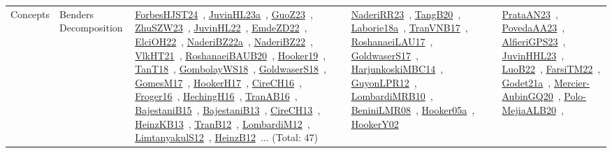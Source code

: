 {\begin{longtable}{lp{3cm}>{\raggedright\arraybackslash}p{6cm}>{\raggedright\arraybackslash}p{6cm}>{\raggedright\arraybackslash}p{8cm}}
Concepts & Benders Decomposition & \href{../works/ForbesHJST24.pdf}{ForbesHJST24}~\cite{ForbesHJST24}, \href{../works/JuvinHL23a.pdf}{JuvinHL23a}~\cite{JuvinHL23a}, \href{../works/GuoZ23.pdf}{GuoZ23}~\cite{GuoZ23}, \href{../works/ZhuSZW23.pdf}{ZhuSZW23}~\cite{ZhuSZW23}, \href{../works/JuvinHL22.pdf}{JuvinHL22}~\cite{JuvinHL22}, \href{../works/EmdeZD22.pdf}{EmdeZD22}~\cite{EmdeZD22}, \href{../works/ElciOH22.pdf}{ElciOH22}~\cite{ElciOH22}, \href{../works/NaderiBZ22a.pdf}{NaderiBZ22a}~\cite{NaderiBZ22a}, \href{../works/NaderiBZ22.pdf}{NaderiBZ22}~\cite{NaderiBZ22}, \href{../works/VlkHT21.pdf}{VlkHT21}~\cite{VlkHT21}, \href{../works/RoshanaeiBAUB20.pdf}{RoshanaeiBAUB20}~\cite{RoshanaeiBAUB20}, \href{../works/Hooker19.pdf}{Hooker19}~\cite{Hooker19}, \href{../works/TanT18.pdf}{TanT18}~\cite{TanT18}, \href{../works/GombolayWS18.pdf}{GombolayWS18}~\cite{GombolayWS18}, \href{../works/GoldwaserS18.pdf}{GoldwaserS18}~\cite{GoldwaserS18}, \href{../works/GomesM17.pdf}{GomesM17}~\cite{GomesM17}, \href{../works/HookerH17.pdf}{HookerH17}~\cite{HookerH17}, \href{../works/CireCH16.pdf}{CireCH16}~\cite{CireCH16}, \href{../works/Froger16.pdf}{Froger16}~\cite{Froger16}, \href{../works/HechingH16.pdf}{HechingH16}~\cite{HechingH16}, \href{../works/TranAB16.pdf}{TranAB16}~\cite{TranAB16}, \href{../works/BajestaniB15.pdf}{BajestaniB15}~\cite{BajestaniB15}, \href{../works/BajestaniB13.pdf}{BajestaniB13}~\cite{BajestaniB13}, \href{../works/CireCH13.pdf}{CireCH13}~\cite{CireCH13}, \href{../works/HeinzKB13.pdf}{HeinzKB13}~\cite{HeinzKB13}, \href{../works/TranB12.pdf}{TranB12}~\cite{TranB12}, \href{../works/LombardiM12.pdf}{LombardiM12}~\cite{LombardiM12}, \href{../works/LimtanyakulS12.pdf}{LimtanyakulS12}~\cite{LimtanyakulS12}, \href{../works/HeinzB12.pdf}{HeinzB12}~\cite{HeinzB12}... (Total: 47) & \href{../works/NaderiRR23.pdf}{NaderiRR23}~\cite{NaderiRR23}, \href{../works/TangB20.pdf}{TangB20}~\cite{TangB20}, \href{../works/Laborie18a.pdf}{Laborie18a}~\cite{Laborie18a}, \href{../works/TranVNB17.pdf}{TranVNB17}~\cite{TranVNB17}, \href{../works/RoshanaeiLAU17.pdf}{RoshanaeiLAU17}~\cite{RoshanaeiLAU17}, \href{../works/GoldwaserS17.pdf}{GoldwaserS17}~\cite{GoldwaserS17}, \href{../works/HarjunkoskiMBC14.pdf}{HarjunkoskiMBC14}~\cite{HarjunkoskiMBC14}, \href{../works/GuyonLPR12.pdf}{GuyonLPR12}~\cite{GuyonLPR12}, \href{../works/LombardiMRB10.pdf}{LombardiMRB10}~\cite{LombardiMRB10}, \href{../works/BeniniLMR08.pdf}{BeniniLMR08}~\cite{BeniniLMR08}, \href{../works/Hooker05a.pdf}{Hooker05a}~\cite{Hooker05a}, \href{../works/HookerY02.pdf}{HookerY02}~\cite{HookerY02} & \href{../works/PrataAN23.pdf}{PrataAN23}~\cite{PrataAN23}, \href{../works/PovedaAA23.pdf}{PovedaAA23}~\cite{PovedaAA23}, \href{../works/AlfieriGPS23.pdf}{AlfieriGPS23}~\cite{AlfieriGPS23}, \href{../works/JuvinHHL23.pdf}{JuvinHHL23}~\cite{JuvinHHL23}, \href{../works/LuoB22.pdf}{LuoB22}~\cite{LuoB22}, \href{../works/FarsiTM22.pdf}{FarsiTM22}~\cite{FarsiTM22}, \href{../works/Godet21a.pdf}{Godet21a}~\cite{Godet21a}, \href{../works/Mercier-AubinGQ20.pdf}{Mercier-AubinGQ20}~\cite{Mercier-AubinGQ20}, \href{../works/Polo-MejiaALB20.pdf}{Polo-MejiaALB20}~\cite{Polo-MejiaALB20}, 
\end{longtable}}
